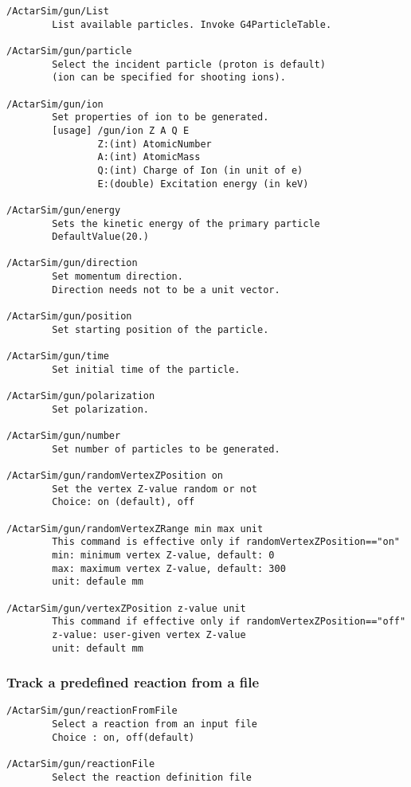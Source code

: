 \begin{verbatim}
/ActarSim/gun/List
        List available particles. Invoke G4ParticleTable.

/ActarSim/gun/particle
        Select the incident particle (proton is default)
        (ion can be specified for shooting ions).

/ActarSim/gun/ion
        Set properties of ion to be generated.
        [usage] /gun/ion Z A Q E
                Z:(int) AtomicNumber
                A:(int) AtomicMass
                Q:(int) Charge of Ion (in unit of e)
                E:(double) Excitation energy (in keV)

/ActarSim/gun/energy
        Sets the kinetic energy of the primary particle
        DefaultValue(20.)

/ActarSim/gun/direction
        Set momentum direction.
        Direction needs not to be a unit vector.

/ActarSim/gun/position
        Set starting position of the particle.

/ActarSim/gun/time      
        Set initial time of the particle.

/ActarSim/gun/polarization
        Set polarization.

/ActarSim/gun/number
        Set number of particles to be generated.

/ActarSim/gun/randomVertexZPosition on
        Set the vertex Z-value random or not
        Choice: on (default), off

/ActarSim/gun/randomVertexZRange min max unit
        This command is effective only if randomVertexZPosition=="on"
        min: minimum vertex Z-value, default: 0
        max: maximum vertex Z-value, default: 300
        unit: defaule mm

/ActarSim/gun/vertexZPosition z-value unit
        This command if effective only if randomVertexZPosition=="off"
        z-value: user-given vertex Z-value
        unit: default mm
\end{verbatim}


\subsubsection{Track a predefined reaction from a file}

\begin{verbatim}
/ActarSim/gun/reactionFromFile
        Select a reaction from an input file
        Choice : on, off(default)

/ActarSim/gun/reactionFile
        Select the reaction definition file
\end{verbatim}


